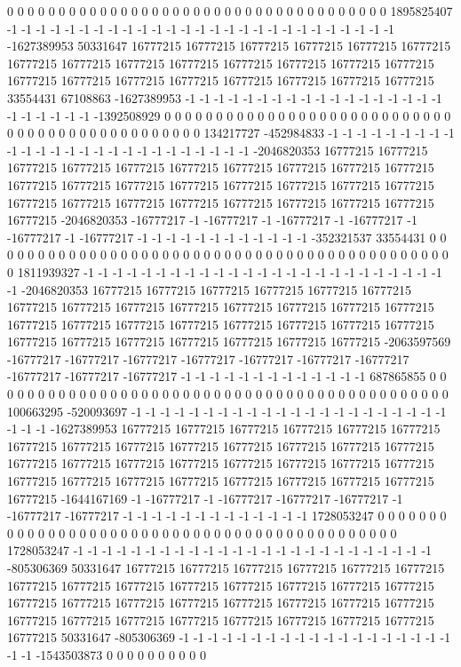 0 0 0 0 0 0 0 0 0 0 0 0 0 0 0 0 0 0 0 0 0 0 0 0 0 0 0 0 0 0 0 0 0 0 0 0 0 1895825407 -1 -1 -1 -1 -1 -1 -1 -1 -1 -1 -1 -1 -1 -1 -1 -1 -1 -1 -1 -1 -1 -1 -1 -1 -1 -1 -1 -1627389953 50331647 16777215 16777215 16777215 16777215 16777215 16777215 16777215 16777215 16777215 16777215 16777215 16777215 16777215 16777215 16777215 16777215 16777215 16777215 16777215 16777215 16777215 16777215 33554431 67108863 -1627389953 -1 -1 -1 -1 -1 -1 -1 -1 -1 -1 -1 -1 -1 -1 -1 -1 -1 -1 -1 -1 -1 -1 -1 -1 -1392508929 0 0 0 0 0 0 0 0 0 0 0
0 0 0 0 0 0 0 0 0 0 0 0 0 0 0 0 0 0 0 0 0 0 0 0 0 0 0 0 0 0 0 0 0 0 0 0 134217727 -452984833 -1 -1 -1 -1 -1 -1 -1 -1 -1 -1 -1 -1 -1 -1 -1 -1 -1 -1 -1 -1 -1 -1 -1 -1 -1 -1 -2046820353 16777215 16777215 16777215 16777215 16777215 16777215 16777215 16777215 16777215 16777215 16777215 16777215 16777215 16777215 16777215 16777215 16777215 16777215 16777215 16777215 16777215 16777215 16777215 16777215 16777215 16777215 16777215 -2046820353 -16777217 -1 -16777217 -1 -16777217 -1 -16777217 -1 -16777217 -1 -16777217 -1 -1 -1 -1 -1 -1 -1 -1 -1 -1 -1 -1 -352321537 33554431 0 0 0 0 0 0 0 0 0 0
0 0 0 0 0 0 0 0 0 0 0 0 0 0 0 0 0 0 0 0 0 0 0 0 0 0 0 0 0 0 0 0 0 0 0 0 1811939327 -1 -1 -1 -1 -1 -1 -1 -1 -1 -1 -1 -1 -1 -1 -1 -1 -1 -1 -1 -1 -1 -1 -1 -1 -1 -1 -2046820353 16777215 16777215 16777215 16777215 16777215 16777215 16777215 16777215 16777215 16777215 16777215 16777215 16777215 16777215 16777215 16777215 16777215 16777215 16777215 16777215 16777215 16777215 16777215 16777215 16777215 16777215 16777215 16777215 16777215 -2063597569 -16777217 -16777217 -16777217 -16777217 -16777217 -16777217 -16777217 -16777217 -16777217 -16777217 -1 -1 -1 -1 -1 -1 -1 -1 -1 -1 -1 -1 -1 687865855 0 0 0 0 0 0 0 0 0 0
0 0 0 0 0 0 0 0 0 0 0 0 0 0 0 0 0 0 0 0 0 0 0 0 0 0 0 0 0 0 0 0 0 0 0 100663295 -520093697 -1 -1 -1 -1 -1 -1 -1 -1 -1 -1 -1 -1 -1 -1 -1 -1 -1 -1 -1 -1 -1 -1 -1 -1 -1 -1627389953 16777215 16777215 16777215 16777215 16777215 16777215 16777215 16777215 16777215 16777215 16777215 16777215 16777215 16777215 16777215 16777215 16777215 16777215 16777215 16777215 16777215 16777215 16777215 16777215 16777215 16777215 16777215 16777215 16777215 16777215 16777215 -1644167169 -1 -16777217 -1 -16777217 -16777217 -16777217 -1 -16777217 -16777217 -1 -1 -1 -1 -1 -1 -1 -1 -1 -1 -1 -1 -1 1728053247 0 0 0 0 0 0 0 0 0 0
0 0 0 0 0 0 0 0 0 0 0 0 0 0 0 0 0 0 0 0 0 0 0 0 0 0 0 0 0 0 0 0 0 0 0 1728053247 -1 -1 -1 -1 -1 -1 -1 -1 -1 -1 -1 -1 -1 -1 -1 -1 -1 -1 -1 -1 -1 -1 -1 -1 -1 -805306369 50331647 16777215 16777215 16777215 16777215 16777215 16777215 16777215 16777215 16777215 16777215 16777215 16777215 16777215 16777215 16777215 16777215 16777215 16777215 16777215 16777215 16777215 16777215 16777215 16777215 16777215 16777215 16777215 16777215 16777215 16777215 16777215 50331647 -805306369 -1 -1 -1 -1 -1 -1 -1 -1 -1 -1 -1 -1 -1 -1 -1 -1 -1 -1 -1 -1 -1 -1543503873 0 0 0 0 0 0 0 0 0 0
